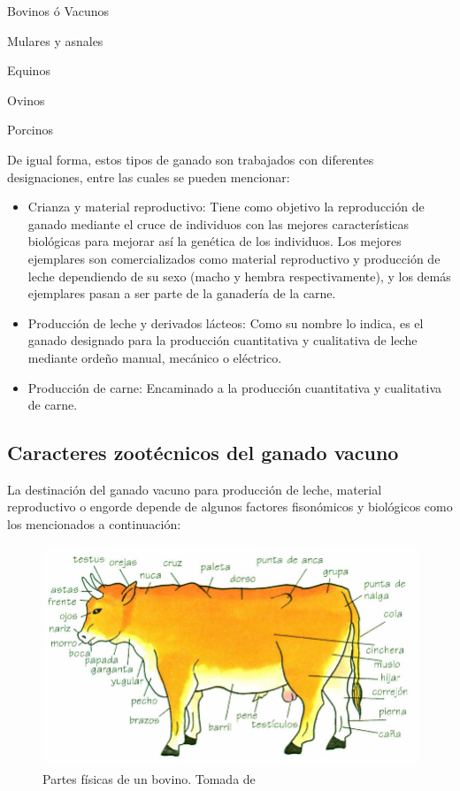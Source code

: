 \begin{itemize}
\begin{multicols}{3}
    \item Bovinos ó Vacunos
    \item Mulares y asnales
    \item Equinos
    \item Ovinos
    \item Porcinos
\end{multicols}
\end{itemize}

De igual forma, estos tipos de ganado son trabajados con diferentes designaciones, entre las cuales se pueden mencionar:

\begin{itemize}
\item Crianza y material reproductivo: Tiene como objetivo la reproducción de ganado mediante el cruce de individuos con las mejores características biológicas para mejorar así la genética de los individuos. Los mejores ejemplares son comercializados como material reproductivo y producción de leche dependiendo de su sexo (macho y hembra respectivamente), y los demás ejemplares pasan a ser parte de la ganadería de la carne.
\item Producción de leche y derivados lácteos: Como su nombre lo indica, es el ganado designado para la producción cuantitativa y cualitativa de leche mediante ordeño manual, mecánico o eléctrico.
\item Producción de carne: Encaminado a la producción cuantitativa y cualitativa de carne.
\end{itemize}

\subsection{Caracteres zootécnicos del ganado vacuno}

La destinación del ganado vacuno para producción de leche, material reproductivo o engorde depende de algunos factores fisonómicos y biológicos como los mencionados a continuación:

\begin{figure}[H]
 \begin{center}
 \includegraphics[scale=0.9]{img/dibujito1.png}
 \end{center}
 \caption{Partes físicas de un bovino. Tomada de \cite{librito1}}
\end{figure}

